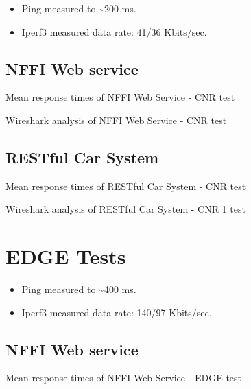 \begin{appendices}
\begin{itemize}
	\item Ping measured to \textasciitilde 200 ms.
	\item Iperf3 measured data rate: 41/36 Kbits/sec.
\end{itemize}


\subsection{NFFI Web service}

\begin{table}[H]

\caption{Mean response times of NFFI Web Service - CNR test}
\end{table}

\begin{table}[H]

\caption{Wireshark analysis of NFFI Web Service - CNR test}
\end{table}


\subsection{RESTful Car System}

\begin{table}[H]

\caption{Mean response times of RESTful Car System - CNR test}
\end{table}

\begin{table}[H]

\caption{Wireshark analysis of RESTful Car System - CNR 1 test}
\end{table}


\section{EDGE Tests}

\begin{itemize}
	\item Ping measured to \textasciitilde 400 ms.
	\item Iperf3 measured data rate: 140/97 Kbits/sec.
\end{itemize}

\subsection{NFFI Web service}

\begin{table}[H]

\caption{Mean response times of NFFI Web Service - EDGE test}
\end{table}


\end{appendices}
